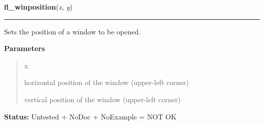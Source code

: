 \hspace{.8\funcindent}\begin{boxedminipage}{\funcwidth}

    \raggedright \textbf{fl\_winposition}(\textit{x}, \textit{y})

    \vspace{-1.5ex}

    \rule{\textwidth}{0.5\fboxrule}
\setlength{\parskip}{2ex}
    Sets the position of a window to be opened.

\setlength{\parskip}{1ex}
      \textbf{Parameters}
      \vspace{-1ex}

      \begin{quote}
        \begin{Ventry}{x}

          \item[x]

          horizontal position of the window (upper-left corner)

          \item[y]

          vertical position of the window (upper-left corner)

        \end{Ventry}

      \end{quote}

\textbf{Status:} Untested + NoDoc + NoExample = NOT OK



    \end{boxedminipage}

    \label{xformslib:library:fl_winposition}

    \vspace{0.5ex}


